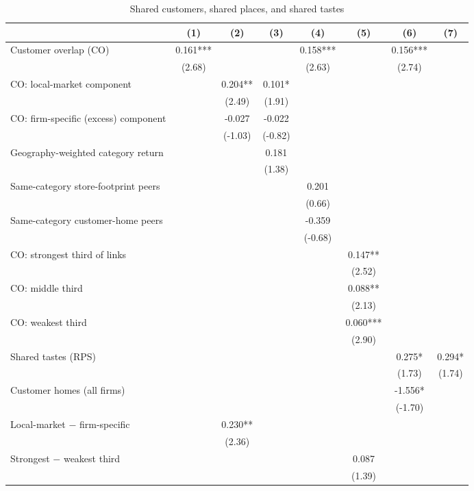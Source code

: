 \begin{table}[!htbp]\centering
\caption{Shared customers, shared places, and shared tastes}\label{tab:decomp}
\scriptsize
\begin{tabular*}{\linewidth}{@{\extracolsep{\fill}}lccccccc}
\toprule
 & (1) & (2) & (3) & (4) & (5) & (6) & (7) \\
\midrule
Customer overlap (CO) & 0.161*** &  &  & 0.158*** &  & 0.156*** &  \\
 & (2.68) &  &  & (2.63) &  & (2.74) &  \\
CO: local-market component &  & 0.204** & 0.101* &  &  &  &  \\
 &  & (2.49) & (1.91) &  &  &  &  \\
CO: firm-specific (excess) component &  & -0.027 & -0.022 &  &  &  &  \\
 &  & (-1.03) & (-0.82) &  &  &  &  \\
Geography-weighted category return &  &  & 0.181 &  &  &  &  \\
 &  &  & (1.38) &  &  &  &  \\
Same-category store-footprint peers &  &  &  & 0.201 &  &  &  \\
 &  &  &  & (0.66) &  &  &  \\
Same-category customer-home peers &  &  &  & -0.359 &  &  &  \\
 &  &  &  & (-0.68) &  &  &  \\
CO: strongest third of links &  &  &  &  & 0.147** &  &  \\
 &  &  &  &  & (2.52) &  &  \\
CO: middle third &  &  &  &  & 0.088** &  &  \\
 &  &  &  &  & (2.13) &  &  \\
CO: weakest third &  &  &  &  & 0.060*** &  &  \\
 &  &  &  &  & (2.90) &  &  \\
Shared tastes (RPS) &  &  &  &  &  & 0.275* & 0.294* \\
 &  &  &  &  &  & (1.73) & (1.74) \\
Customer homes (all firms) &  &  &  &  &  & -1.556* &  \\
 &  &  &  &  &  & (-1.70) &  \\
\addlinespace
Local-market $-$ firm-specific &  & 0.230** &  &  &  &  &  \\
 &  & (2.36) &  &  &  &  &  \\
Strongest $-$ weakest third &  &  &  &  & 0.087 &  &  \\
 &  &  &  &  & (1.39) &  &  \\

\end{tabular*}
\end{table}
